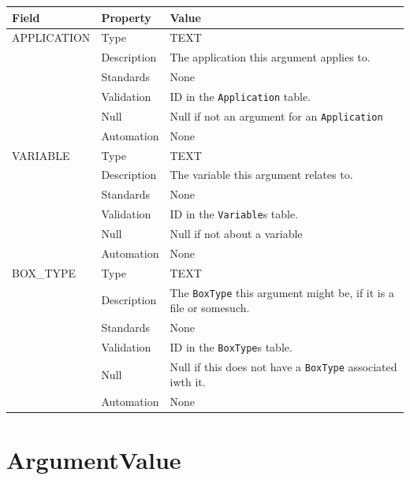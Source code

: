 \documentclass[
]{article}
\newcounter{none} %
\begin{document}
{\def\LTcaptype{none} %
\begin{longtable}[]{@{}
  >{\raggedright\arraybackslash}p{}
  >{\raggedright\arraybackslash}p{}
  >{\raggedright\arraybackslash}p{}@{}}
\toprule\noalign{}
\begin{minipage}[b]{\linewidth}\raggedright
Field
\end{minipage} & \begin{minipage}[b]{\linewidth}\raggedright
Property
\end{minipage} & \begin{minipage}[b]{\linewidth}\raggedright
Value
\end{minipage} \\
\midrule\noalign{}
\endhead
\bottomrule\noalign{}
\endlastfoot
APPLICATION & Type & TEXT \\
& Description & The application this argument applies to. \\
& Standards & None \\
& Validation & ID in the \texttt{Application} table. \\
& Null & Null if not an argument for an \texttt{Application} \\
& Automation & None \\
VARIABLE & Type & TEXT \\
& Description & The variable this argument relates to. \\
& Standards & None \\
& Validation & ID in the \texttt{Variable}s table. \\
& Null & Null if not about a variable \\
& Automation & None \\
BOX\_TYPE & Type & TEXT \\
& Description & The \texttt{BoxType} this argument might be, if it is a
file or somesuch. \\
& Standards & None \\
& Validation & ID in the \texttt{BoxType}s table. \\
& Null & Null if this does not have a \texttt{BoxType} associated iwth
it. \\
& Automation & None \\
\end{longtable}
}

\section{ArgumentValue}\label{argumentvalue}
\end{document}
